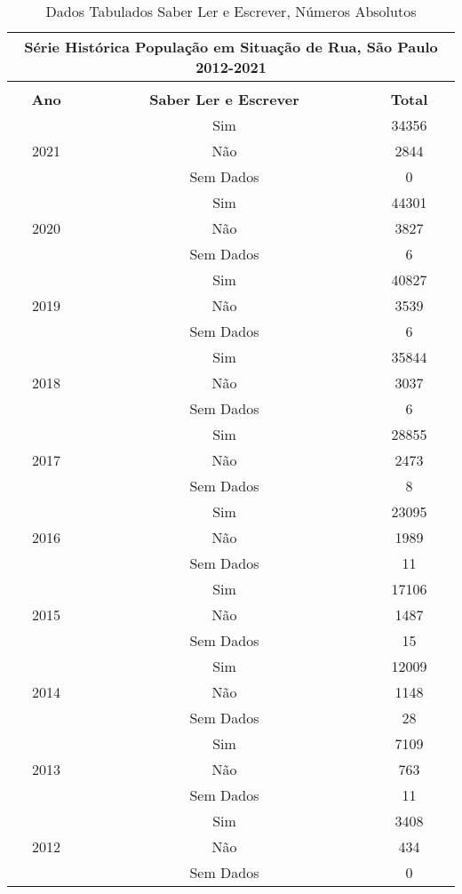 \documentclass[14pt]{extarticle}
\begin{document}
\begin{table}[htbp]
  \centering
  \caption{Dados Tabulados Saber Ler e Escrever, Números Absolutos}
   \tabcolsep=0.15cm
	\renewcommand{\arraystretch}{0.9}
	\begin{adjustbox}{max width=\linewidth}
    \begin{tabular}{ccc}
    \toprule
    \multicolumn{3}{c}{Série Histórica População em Situação de Rua, São Paulo 2012-2021} \\
    \midrule
         &      &  \\
    \midrule
    \rowcolor[rgb]{ .906,  .902,  .902} \textbf{Ano} & \textbf{Saber Ler e Escrever} & \textbf{Total} \\
    \midrule
    \multirow{3}[2]{*}{2021} & Sim  & 34356 \\
         & Não  & 2844 \\
         & Sem Dados & 0 \\
    \midrule
    \multirow{3}[2]{*}{2020} & Sim  & 44301 \\
         & Não  & 3827 \\
         & Sem Dados & 6 \\
    \midrule
    \multirow{3}[2]{*}{2019} & Sim  & 40827 \\
         & Não  & 3539 \\
         & Sem Dados & 6 \\
    \midrule
    \multirow{3}[2]{*}{2018} & Sim  & 35844 \\
         & Não  & 3037 \\
         & Sem Dados & 6 \\
    \midrule
    \multirow{3}[2]{*}{2017} & Sim  & 28855 \\
         & Não  & 2473 \\
         & Sem Dados & 8 \\
    \midrule
    \multirow{3}[2]{*}{2016} & Sim  & 23095 \\
         & Não  & 1989 \\
         & Sem Dados & 11 \\
    \midrule
    \multirow{3}[2]{*}{2015} & Sim  & 17106 \\
         & Não  & 1487 \\
         & Sem Dados & 15 \\
    \midrule
    \multirow{3}[2]{*}{2014} & Sim  & 12009 \\
         & Não  & 1148 \\
         & Sem Dados & 28 \\
    \midrule
    \multirow{3}[2]{*}{2013} & Sim  & 7109 \\
         & Não  & 763 \\
         & Sem Dados & 11 \\
    \midrule
    \multirow{3}[2]{*}{2012} & Sim  & 3408 \\
         & Não  & 434 \\
         & Sem Dados & 0 \\
    \bottomrule
    \end{tabular}%
    \end{adjustbox}
  \label{tab:saber_ler_escrever2}%
\end{table}%
\end{document}
